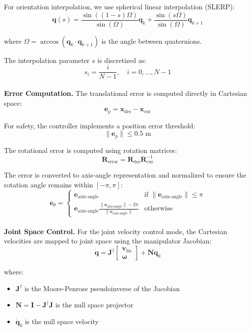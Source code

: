 \noindent For orientation interpolation, we use spherical linear interpolation (SLERP):
\[
    \mathbf{q}(s) = \frac{\sin((1-s)\Omega)}{\sin(\Omega)}\mathbf{q}_k + \frac{\sin(s\Omega)}{\sin(\Omega)}\mathbf{q}_{k+1}
\]

\noindent where $\Omega = \arccos(\mathbf{q}_k \cdot \mathbf{q}_{k+1})$ is the angle between quaternions. 

\noindent The interpolation parameter $s$ is discretized as:
\[
    s_i = \frac{i}{N-1}, \quad i = 0,\ldots,N-1
\]
\\
\noindent \textbf{Error Computation.} The translational error is computed directly in Cartesian space:
\[
    \mathbf{e}_p = \mathbf{x}_{\text{des}} - \mathbf{x}_{\text{cur}}
\]

\noindent For safety, the controller implements a position error threshold:
\[
    \|\mathbf{e}_p\| \leq 0.5 \text{ m}
\]

\noindent The rotational error is computed using rotation matrices:
\[
    \mathbf{R}_{\text{error}} = \mathbf{R}_{\text{des}} \mathbf{R}_{\text{cur}}^{-1}
\]

\noindent The error is converted to axis-angle representation and normalized to ensure the rotation angle remains within $[-\pi, \pi]$:
\[
    \mathbf{e}_\theta = \begin{cases}
        \mathbf{e}_{\text{axis-angle}} & \text{if } \|\mathbf{e}_{\text{axis-angle}}\| \leq \pi \\
        \mathbf{e}_{\text{axis-angle}} \frac{\|\mathbf{e}_{\text{axis-angle}}\| - 2\pi}{\|\mathbf{e}_{\text{axis-angle}}\|} & \text{otherwise}
    \end{cases}
\]
\\
\noindent \textbf{Joint Space Control.} For the joint velocity control mode, the Cartesian velocities are mapped to joint space using the manipulator Jacobian:
\[
    \dot{\mathbf{q}} = \mathbf{J}^\dagger \begin{bmatrix} \mathbf{v}_{\text{lin}} \\ \boldsymbol{\omega} \end{bmatrix} + \mathbf{N}\dot{\mathbf{q}}_0
\]

\noindent where:
\begin{itemize}
    \item $\mathbf{J}^\dagger$ is the Moore-Penrose pseudoinverse of the Jacobian
    \item $\mathbf{N} = \mathbf{I} - \mathbf{J}^\dagger\mathbf{J}$ is the null space projector
    \item $\dot{\mathbf{q}}_0$ is the null space velocity\\
\end{itemize}

